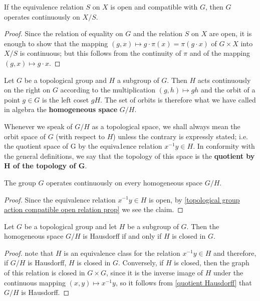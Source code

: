 \begin{proposition}\label{topological group action compatible open relation prop}
If the equivalence relation $S$ on $X$ is open and compatible with $G$, then $G$ operates continuously on $X/S$.
\end{proposition}
\begin{proof}
Since the relation of equality on $G$ and the relation $S$ on $X$ are open, it is enough to show that the mapping $(g,x)\mapsto g\cdot\pi(x)=\pi(g\cdot x)$ of $G\times X$ into $X/S$ is continuous; but this follows from the continuity of $\pi$ and of the mapping $(g,x)\mapsto g\cdot x$.
\end{proof}
Let $G$ be a topological group and $H$ a subgroup of $G$. Then $H$ acts continuously on the right on $G$ according to the multiplication $(g,h)\mapsto gh$ and the orbit of a point $g\in G$ is the left coset $gH$. The set of orbits is therefore what we have called in algebra the \textbf{homogeneous space} $G/H$.\par
Whenever we speak of $G/H$ as a topological space, we shall always mean the orbit space of $G$ (with respect to $H$) unless the contrary is expressly stated; i.e. the quotient space of G by the equiva1ence relation $x^{-1}y\in H$. In conformity with the general definitions, we say that the topology of this space is the \textbf{quotient by $\bm{H}$ of the topology of $\bm{G}$}.
\begin{proposition}
The group $G$ operates continuously on every homogeneous space $G/H$.
\end{proposition}
\begin{proof}
Since the equivalence relation $x^{-1}y\in H$ is open, by \cref{topological group action compatible open relation prop} we see the claim.
\end{proof}
\begin{proposition}\label{topological group coset space Hausdorff iff}
Let $G$ be a topological group and let $H$ be a subgroup of $G$. Then the homogeneous space $G/H$ is Hausdorff if and only if $H$ is closed in $G$.
\end{proposition}
\begin{proof}
note that $H$ is an equivalence class for the relation $x^{-1}y\in H$ and therefore, if $G/H$ is Hausdorff, $H$ is closed in $G$. Conversely, if $H$ is closed, then the graph of this relation is closed in $G\times G$, since it is the inverse image of $H$ under the continuous mapping $(x,y)\mapsto x^{-1}y$, so it follows from \cref{quotient Hausdorff} that $G/H$ is Hausdorff.
\end{proof}
